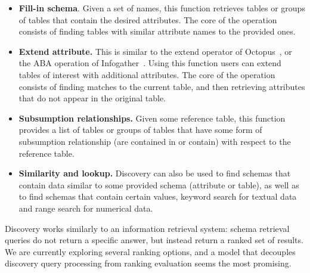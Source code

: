 \begin{itemize}
\item \textbf{Fill-in schema}. Given a set of names, this function retrieves 
tables or groups of tables that contain the desired attributes. The core
of the operation consists of finding tables with similar attribute names to the
provided ones.

\item \textbf{Extend attribute.} This is similar to the extend operator of
Octopus~\cite{DBLP:journals/pvldb/CafarellaHK09}, or the ABA operation of
Infogather~\cite{DBLP:conf/sigmod/YakoutGCC12}. Using this function users can
extend tables of interest with additional attributes. The core of the operation
consists of finding matches to the current table, and then retrieving 
attributes that do not appear in the original table.

\item \textbf{Subsumption relationships.} Given some reference table, this
function provides a list of tables or groups of tables that have some form of
subsumption relationship (\ie are contained in or contain) with respect to the
reference table. 

\item \textbf{Similarity and lookup.} Discovery can also be used to find schemas
that contain data similar to some provided schema (attribute or table), as well
as to find schemas that contain certain values, \ie keyword search for textual
data and range search for numerical data.  

\end{itemize}

Discovery works similarly to an information retrieval system: schema retrieval queries
do not return a specific answer, but instead return a ranked set of results. We
are currently exploring several ranking options, and a model that decouples
discovery query processing from ranking evaluation seems the most promising.


